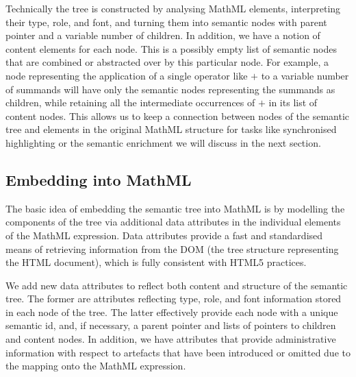 \documentclass[conference]{IEEEtran}
\begin{document}
Technically the tree is constructed by analysing MathML elements, interpreting
their type, role, and font, and turning them into semantic nodes with parent
pointer and a variable number of children. In addition, we have a notion of
content elements for each node. This is a possibly empty list of semantic nodes
that are combined or abstracted over by this particular node.
For example, a node representing the application of a single operator like $+$
to a variable number of summands will have only the semantic nodes representing
the summands as children, while retaining all the intermediate occurrences of
$+$ in its list of content nodes. This allows us to keep a connection between
nodes of the semantic tree and elements in the original MathML structure for
tasks like synchronised highlighting or the semantic enrichment we will discuss
in the next section.



\subsection{Embedding into MathML}
\label{sec:embedding}

The basic idea of embedding the semantic tree into MathML is by modelling the
components of the tree via additional data attributes in the individual elements
of the MathML expression.  Data attributes provide a fast and standardised means
of retrieving information from the DOM (the tree structure representing the HTML
document), which is fully consistent with HTML5 practices.

We add new data attributes to reflect both content and structure of the semantic
tree. The former are attributes reflecting type, role, and font information
stored in each node of the tree. The latter effectively provide each node with a
unique semantic id, and, if necessary, a parent pointer and lists of pointers to
children and content nodes. In addition, we have attributes that provide
administrative information with respect to artefacts that have been introduced
or omitted due to the mapping onto the MathML expression.
\end{document}
